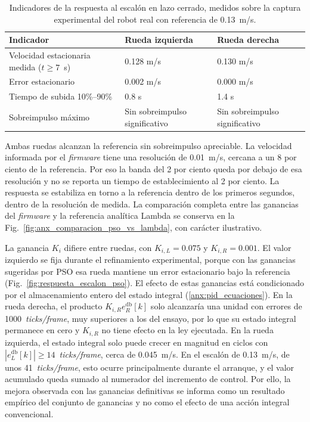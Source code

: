 \begin{table}[htbp]
\centering
\caption{Indicadores de la respuesta al escalón en lazo cerrado, medidos sobre la captura experimental del robot real con referencia de 0.13~m/s.}
\label{tab:pid_performance}
\small
\begin{tabular}{p{6.8cm} p{3.1cm} p{3.1cm}}
\toprule
\textbf{Indicador} & \textbf{Rueda izquierda} & \textbf{Rueda derecha} \\
\midrule
Velocidad estacionaria medida ($t\geq 7$~s) & 0.128 m/s & 0.130 m/s \\
Error estacionario & 0.002 m/s & 0.000 m/s \\
Tiempo de subida 10\%--90\% & 0.8 s & 1.4 s \\
Sobreimpulso máximo & Sin sobreimpulso significativo & Sin sobreimpulso significativo \\
\bottomrule
\end{tabular}
\end{table}

Ambas ruedas alcanzan la referencia sin sobreimpulso apreciable. La velocidad informada por el \textit{firmware} tiene una resolución de 0.01~m/s, cercana a un 8 por ciento de la referencia. Por eso la banda del 2 por ciento queda por debajo de esa resolución y no se reporta un tiempo de establecimiento al 2 por ciento. La respuesta se estabiliza en torno a la referencia dentro de los primeros segundos, dentro de la resolución de medida.
La comparación completa entre las ganancias del \textit{firmware} y la referencia
analítica Lambda se conserva en la Fig.~\ref{fig:anx_comparacion_pso_vs_lambda}, con carácter ilustrativo.

La ganancia $K_i$ difiere entre ruedas, con $K_{i,L}=0.075$ y $K_{i,R}=0.001$. El valor izquierdo se fija durante el refinamiento experimental, porque con las ganancias sugeridas por PSO esa rueda mantiene un error estacionario bajo la referencia (Fig.~\ref{fig:respuesta_escalon_pso}). El efecto de estas ganancias está condicionado por el almacenamiento entero del estado integral (\ref{anx:pid_ecuaciones}). En la rueda derecha, el producto $K_{i,R}e_R^{\mathrm{db}}[k]$ solo alcanzaría una unidad con errores de 1000~\textit{ticks/frame}, muy superiores a los del ensayo, por lo que su estado integral permanece en cero y $K_{i,R}$ no tiene efecto en la ley ejecutada. En la rueda izquierda, el estado integral solo puede crecer en magnitud en ciclos con $|e_L^{\mathrm{db}}[k]|\geq14$~\textit{ticks/frame}, cerca de 0.045~m/s. En el escalón de 0.13~m/s, de unos 41~\textit{ticks/frame}, esto ocurre principalmente durante el arranque, y el valor acumulado queda sumado al numerador del incremento de control. Por ello, la mejora observada con las ganancias definitivas se informa como un resultado empírico del conjunto de ganancias y no como el efecto de una acción integral convencional.

